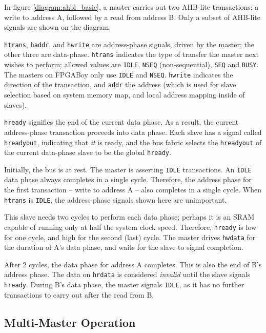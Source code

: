 \documentclass{article}
\begin{document}
In figure \ref{diagram:ahbl_basic}, a master carries out two AHB-lite transactions: a write to address A, followed by a read from address B. Only a subset of AHB-lite signals are shown on the diagram.

\texttt{htrans}, \texttt{haddr}, and \texttt{hwrite} are address-phase signals, driven by the master; the other three are data-phase. \texttt{htrans} indicates the type of transfer the master next wishes to perform; allowed values are \texttt{IDLE}, \texttt{NSEQ} (non-sequential), \texttt{SEQ} and \texttt{BUSY}. The masters on FPGABoy only use \texttt{IDLE} and \texttt{NSEQ}. \texttt{hwrite} indicates the direction of the transaction, and \texttt{addr} the address (which is used for slave selection based on system memory map, and local address mapping inside of slaves).

\texttt{hready} signifies the end of the current data phase. As a result, the current address-phase transaction proceeds into data phase. Each slave has a signal called \texttt{hreadyout}, indicating that \textit{it} is ready, and the bus fabric selects the \texttt{hreadyout} of the current data-phase slave to be the global \texttt{hready}.

Initially, the bus is at rest. The master is asserting \texttt{IDLE} transactions. An \texttt{IDLE} data phase always completes in a single cycle. Therefore, the address phase for the first transaction -- write to address A -- also completes in a single cycle. When \texttt{htrans} is \texttt{IDLE}, the address-phase signals shown here are unimportant.

This slave needs two cycles to perform each data phase; perhaps it is an SRAM capable of running only at half the system clock speed. Therefore, \texttt{hready} is low for one cycle, and high for the second (last) cycle. The master drives \texttt{hwdata} for the duration of A's data phase, and waits for the slave to signal completion.

After 2 cycles, the data phase for address A completes. This is also the end of B's address phase. The data on \texttt{hrdata} is considered \textit{invalid} until the slave signals \texttt{hready}. During B's data phase, the master signals \texttt{IDLE}, as it has no further transactions to carry out after the read from B.

\subsection{Multi-Master Operation}
\end{document}
